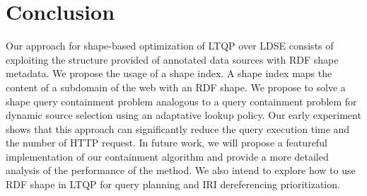 \section{Conclusion}
Our approach for shape-based optimization of LTQP over LDSE consists of exploiting the structure provided of
annotated data sources with RDF shape metadata. We propose the usage of a shape index.
A shape index maps the content of a subdomain of the web with an RDF shape. We propose to solve
a shape query containment problem analogous to a query containment problem for dynamic source selection
using an adaptative lookup policy. 
Our early experiment shows that this approach can significantly reduce the query execution time and the number of HTTP request.
In future work, we will propose a featureful implementation of our containment algorithm and provide a more
detailed analysis of the performance of the method. We also intend to explore how to use RDF 
shape in LTQP for query planning and IRI dereferencing prioritization.